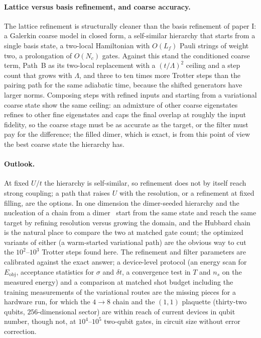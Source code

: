 \documentclass[a4paper,11pt,noarxiv]{quantumarticle}
\newcommand{\Eobj}{E_{\mathrm{obj}}}
\begin{document}
\paragraph{Lattice versus basis refinement, and coarse accuracy.}
The lattice refinement is structurally cleaner than the basis refinement
of paper I: a Galerkin coarse model in closed form, a self-similar
hierarchy that starts from a single basis state, a two-local Hamiltonian
with $O(L_f)$ Pauli strings of weight two, a prolongation of $O(N_c)$ gates.
Against this stand the conditioned coarse term, Path~B as its two-local
replacement with a $(t/\Lambda)^2$ ceiling and a step count that grows with
$\Lambda$, and three to ten times more Trotter steps than the pairing path
for the same adiabatic time, because the shifted generators have larger
norms.  Composing steps with refined inputs and starting from a variational
coarse state show the same ceiling: an admixture of other coarse
eigenstates refines to other fine eigenstates and caps the final overlap at
roughly the input fidelity, so the coarse stage must be as accurate as the
target, or the filter must pay for the difference; the filled dimer, which
is exact, is from this point of view the best coarse state the hierarchy
has.

\paragraph{Outlook.}
At fixed $U/t$ the hierarchy is self-similar, so refinement does not by
itself reach strong coupling; a path that raises $U$ with the resolution,
or a refinement at fixed filling, are the options.  In one dimension the
dimer-seeded hierarchy and the nucleation of a chain from a
dimer~\cite{Sadia2026} start from the same state and reach the same target
by refining resolution versus growing the domain, and the Hubbard chain is
the natural place to compare the two at matched gate count; the optimized
variants of either (a warm-started variational path) are the obvious way to
cut the $10^2$--$10^3$ Trotter steps found here.  The refinement and filter
parameters are calibrated against the exact answer; a device-level protocol
(an energy scan for $\Eobj$, acceptance statistics for $\sigma$ and
$\delta t$, a convergence test in $T$ and $n_s$ on the measured energy) and
a comparison at matched shot budget including the training measurements of
the variational routes are the missing pieces for a hardware run, for which
the $4\to8$ chain and the $(1,1)$ plaquette (thirty-two qubits,
$256$-dimensional sector) are within reach of current devices in qubit
number, though not, at $10^{4}$--$10^{5}$ two-qubit gates, in circuit size
without error correction.
\end{document}
